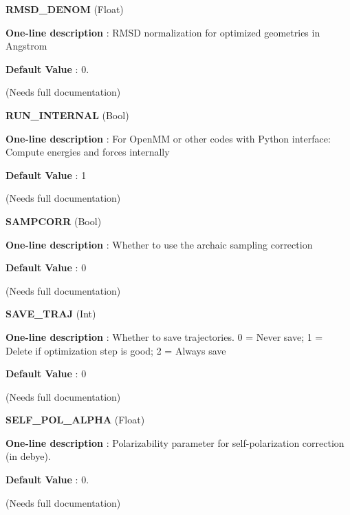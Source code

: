 \begin{DoxyItemize}
\item {\bfseries  R\-M\-S\-D\-\_\-\-D\-E\-N\-O\-M } (Float) \par
{\bfseries  One-\/line description }\-: R\-M\-S\-D normalization for optimized geometries in Angstrom \par
{\bfseries  Default Value }\-: 0. \par
(Needs full documentation)\end{DoxyItemize}
\begin{DoxyItemize}
\item {\bfseries  R\-U\-N\-\_\-\-I\-N\-T\-E\-R\-N\-A\-L } (Bool) \par
{\bfseries  One-\/line description }\-: For Open\-M\-M or other codes with Python interface\-: Compute energies and forces internally \par
{\bfseries  Default Value }\-: 1 \par
(Needs full documentation)\end{DoxyItemize}
\begin{DoxyItemize}
\item {\bfseries  S\-A\-M\-P\-C\-O\-R\-R } (Bool) \par
{\bfseries  One-\/line description }\-: Whether to use the archaic sampling correction \par
{\bfseries  Default Value }\-: 0 \par
(Needs full documentation)\end{DoxyItemize}
\begin{DoxyItemize}
\item {\bfseries  S\-A\-V\-E\-\_\-\-T\-R\-A\-J } (Int) \par
{\bfseries  One-\/line description }\-: Whether to save trajectories. 0 = Never save; 1 = Delete if optimization step is good; 2 = Always save \par
{\bfseries  Default Value }\-: 0 \par
(Needs full documentation)\end{DoxyItemize}
\begin{DoxyItemize}
\item {\bfseries  S\-E\-L\-F\-\_\-\-P\-O\-L\-\_\-\-A\-L\-P\-H\-A } (Float) \par
{\bfseries  One-\/line description }\-: Polarizability parameter for self-\/polarization correction (in debye). \par
{\bfseries  Default Value }\-: 0. \par
(Needs full documentation)\end{DoxyItemize}
